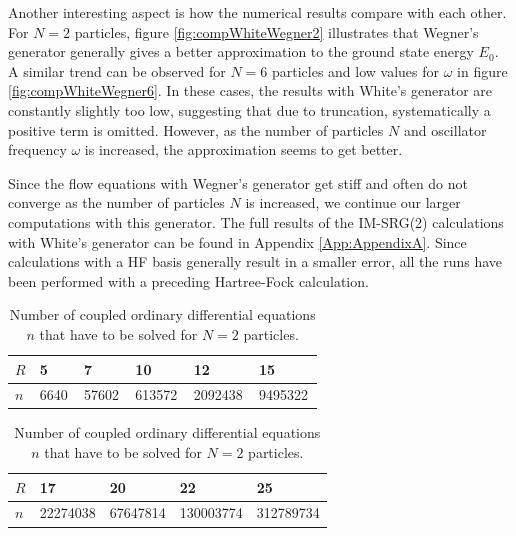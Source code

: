 Another interesting aspect is how the numerical results compare with each other. For $N=2$ particles, figure \ref{fig:compWhiteWegner2} illustrates that Wegner's generator generally gives a better approximation to the ground state energy $E_0$. A similar trend can be observed for $N=6$ particles and low values for $\omega$ in figure \ref{fig:compWhiteWegner6}. In these cases, the results with White's generator are constantly slightly too low, suggesting that due to truncation, systematically a positive term is omitted. However, as the number of particles $N$ and oscillator frequency $\omega$ is increased, the approximation seems to get better.

Since the flow equations with Wegner's generator get stiff and often do not converge as the number of particles $N$ is increased, we continue our larger computations with this generator. The full results of the IM-SRG(2) calculations with White's generator can be found in Appendix \ref{App:AppendixA}. Since calculations with a HF basis generally result in a smaller error, all the runs have been performed with a preceding Hartree-Fock calculation.

\begin{table}
\begin{center}
\begin{tabular}{l|l|l|l|l|l}
\hline
$R$& 5 &7 & 10 & 12& 15\\
\hline
$n$ & 6640\, &57602\, &613572\, &2092438\, & 9495322\, \\
\hline
\end{tabular}

\begin{tabular}{l|l|l|l|l}
\hline
$R$& 17&  20 &22&  25 \\
\hline
$n$ & 22274038 & 67647814& 130003774 & 312789734 \\
\hline
\end{tabular}
\end{center}
\caption{Number of coupled ordinary differential equations $n$ that have to be solved for $N=2$ particles.}
\label{tab:numlig}
\end{table}

